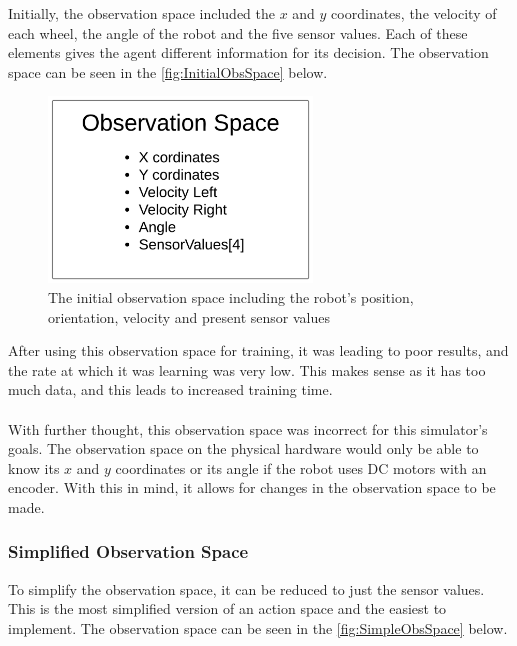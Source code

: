 \documentclass[a4paper,12pt]{article}
\begin{document}
Initially, the observation space included the $x$ and $y$ coordinates, the velocity of each wheel, the angle of the robot and the five sensor values. Each of these elements gives the agent different information for its decision. The observation space can be seen in the \autoref{fig:InitialObsSpace} below.

\begin{figure}[H]
\centering
\includegraphics[width=7cm]{imgs/InitialObsSpace.png}
\caption{The initial observation space including the robot's position, orientation, velocity and present sensor values}
\label{fig:InitialObsSpace}
\end{figure}

 \noindent
After using this observation space for training, it was leading to poor results, and the rate at which it was learning was very low. This makes sense as it has too much data, and this leads to increased training time.
\\\\
With further thought, this observation space was incorrect for this simulator's goals. The observation space on the physical hardware would only be able to know its $x$ and $y$ coordinates or its angle if the robot uses DC motors with an encoder. With this in mind, it allows for changes in the observation space to be made.


\subsubsection{Simplified Observation Space}

To simplify the observation space, it can be reduced to just the sensor values. This is the most simplified version of an action space and the easiest to implement. The observation space can be seen in the \autoref{fig:SimpleObsSpace} below. 
\end{document}
